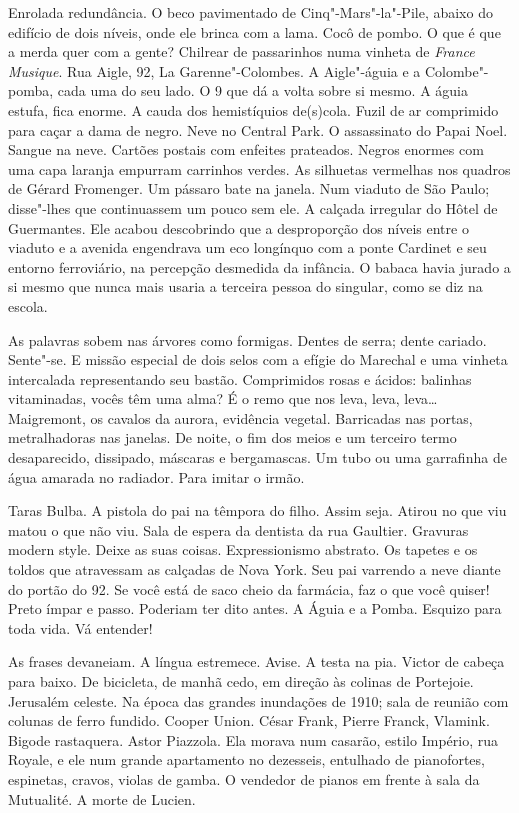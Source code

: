 Enrolada redundância. O beco pavimentado de Cinq"-Mars"-la"-Pile, abaixo do
edifício de dois níveis, onde ele brinca com a lama. Cocô de pombo. O
que é que a merda quer com a gente? Chilrear de passarinhos numa vinheta
de \emph{France Musique}. Rua Aigle, 92, La Garenne"-Colombes. A
Aigle"-águia e a Colombe"-pomba, cada uma do seu lado. O 9 que dá a volta
sobre si mesmo. A águia estufa, fica enorme. A cauda dos hemistíquios
de(s)cola. Fuzil de ar comprimido para caçar a dama de negro. Neve no
Central Park. O assassinato do Papai Noel. Sangue na neve. Cartões
postais com enfeites prateados. Negros enormes com uma capa laranja
empurram carrinhos verdes. As silhuetas vermelhas nos quadros de Gérard
Fromenger. Um pássaro bate na janela. Num viaduto de São Paulo;
disse"-lhes que continuassem um pouco sem ele. A calçada irregular do
Hôtel de Guermantes. Ele acabou descobrindo que a desproporção dos
níveis entre o viaduto e a avenida engendrava um eco longínquo com a
ponte Cardinet e seu entorno ferroviário, na percepção desmedida da
infância. O babaca havia jurado a si mesmo que nunca mais usaria a
terceira pessoa do singular, como se diz na escola.

As palavras sobem nas árvores como formigas. Dentes de serra; dente
cariado. Sente"-se. E missão especial de dois selos com a efígie do
Marechal e uma vinheta intercalada representando seu bastão. Comprimidos
rosas e ácidos: balinhas vitaminadas, vocês têm uma alma? É o remo que
nos leva, leva, leva\ldots{} Maigremont, os cavalos da aurora, evidência
vegetal. Barricadas nas portas, metralhadoras nas janelas. De noite, o
fim dos meios e um terceiro termo desaparecido, dissipado, máscaras e
bergamascas. Um tubo ou uma garrafinha de água amarada no radiador. Para
imitar o irmão.

Taras Bulba. A pistola do pai na têmpora do filho. Assim seja. Atirou no
que viu matou o que não viu. Sala de espera da dentista da rua Gaultier.
Gravuras modern style. Deixe as suas coisas. Expressionismo abstrato. Os
tapetes e os toldos que atravessam as calçadas de Nova York. Seu pai
varrendo a neve diante do portão do 92. Se você está de saco cheio da
farmácia, faz o que você quiser! Preto ímpar e passo. Poderiam ter dito
antes. A Águia e a Pomba. Esquizo para toda vida. Vá entender!

As frases devaneiam. A língua estremece. Avise. A testa na pia. Victor
de cabeça para baixo. De bicicleta, de manhã cedo, em direção às colinas
de Portejoie. Jerusalém celeste. Na época das grandes inundações de
1910; sala de reunião com colunas de ferro fundido. Cooper Union. César
Frank, Pierre Franck, Vlamink. Bigode rastaquera. Astor Piazzola. Ela
morava num casarão, estilo Império, rua Royale, e ele num grande
apartamento no dezesseis, entulhado de pianofortes, espinetas,
cravos, violas de gamba. O vendedor de pianos em frente à sala da
Mutualité. A morte de Lucien.

